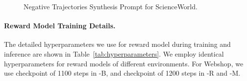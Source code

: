 \begin{figure}[!htp]
    \centering
    \vspace{-8pt}
    \caption{
    Negative Trajectories Synthesis Prompt for ScienceWorld.
    }
    \label{fig:neg_trajectories_synthesis_sciworld}
\end{figure}


\paragraph{Reward Model Training Details.} 
The detailed hyperparameters we use for reward model during training and inference are shown in Table~\ref{tab:hyperparameters}. We employ
identical hyperparameters for reward models of different environments. For Webshop, we use checkpoint of 1100 steps in \Model-B, and checkpoint of 1200 steps in \Model-R and \Model-M. 
\begin{table}[ht]
    \centering
    \renewcommand\arraystretch{1.1}
    
    \caption{Detailed hyperparameters used in reward model.}
    \label{tab:hyperparameters}
\end{table}

